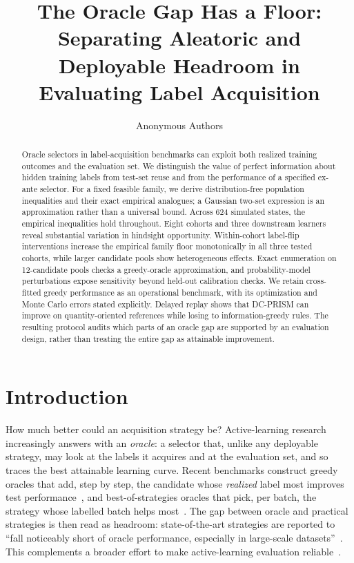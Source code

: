 \documentclass[runningheads]{llncs}
\begin{document}
\title{The Oracle Gap Has a Floor: Separating Aleatoric and Deployable Headroom in Evaluating Label Acquisition}
\author{Anonymous Authors}
\maketitle
\begin{abstract}
Oracle selectors in label-acquisition benchmarks can exploit both realized training outcomes and the evaluation set. We distinguish the value of perfect information about hidden training labels from test-set reuse and from the performance of a specified ex-ante selector. For a fixed feasible family, we derive distribution-free population inequalities and their exact empirical analogues; a Gaussian two-set expression is an approximation rather than a universal bound. Across 624 simulated states, the empirical inequalities hold throughout. Eight cohorts and three downstream learners reveal substantial variation in hindsight opportunity. Within-cohort label-flip interventions increase the empirical family floor monotonically in all three tested cohorts, while larger candidate pools show heterogeneous effects. Exact enumeration on 12-candidate pools checks a greedy-oracle approximation, and probability-model perturbations expose sensitivity beyond held-out calibration checks. We retain cross-fitted greedy performance as an operational benchmark, with its optimization and Monte Carlo errors stated explicitly. Delayed replay shows that DC-PRISM can improve on quantity-oriented references while losing to information-greedy rules. The resulting protocol audits which parts of an oracle gap are supported by an evaluation design, rather than treating the entire gap as attainable improvement.
\end{abstract}

\section{Introduction}
\label{sec:intro}
How much better could an acquisition strategy be? Active-learning research increasingly answers with an \emph{oracle}: a selector that, unlike any deployable strategy, may look at the labels it acquires and at the evaluation set, and so traces the best attainable learning curve. Recent benchmarks construct greedy oracles that add, step by step, the candidate whose \emph{realized} label most improves test performance~\cite{werner2023comparable,werner2024cdalbench}, and best-of-strategies oracles that pick, per batch, the strategy whose labelled batch helps most~\cite{huseljic2026boss}. The gap between oracle and practical strategies is then read as headroom: state-of-the-art strategies are reported to ``fall noticeably short of oracle performance, especially in large-scale datasets''~\cite{huseljic2026boss}. This complements a broader effort to make active-learning evaluation reliable~\cite{luth2023navigating,ji2023randomness}.
\end{document}
